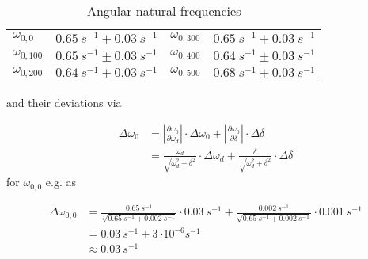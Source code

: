             \begin{table}[h]
                \centering
                \caption[Angular natural frequencies]{Angular natural frequencies}
                \begin{tabular}{@{}llll@{}}
                    \toprule
                    $\omega_{0,0}$      &$\SI{0.65}{s^{-1}} \pm \SI{0.03}{s^{-1}}$  &\hspace{10mm}$\omega_{0,300}$   &$\SI{0.65}{s^{-1}} \pm \SI{0.03}{s^{-1}}$\\
                    $\omega_{0,100}$    &$\SI{0.65}{s^{-1}} \pm \SI{0.03}{s^{-1}}$  &\hspace{10mm}$\omega_{0,400}$   &$\SI{0.64}{s^{-1}} \pm \SI{0.03}{s^{-1}}$\\
                    $\omega_{0,200}$    &$\SI{0.64}{s^{-1}} \pm \SI{0.03}{s^{-1}}$  &\hspace{10mm}$\omega_{0,500}$   &$\SI{0.68}{s^{-1}} \pm \SI{0.03}{s^{-1}}$\\
                    \bottomrule
                \end{tabular}
                \label{tab:angular_natural_frequencies}
            \end{table}
            and their deviations via\par
            \begin{align}
                \Delta\omega_0  &=\left| \frac{\partial\omega_0}{\partial\omega_d} \right| \cdot \Delta\omega_0 + \left| \frac{\partial\omega_0}{\partial\delta} \right| \cdot \Delta\delta \nonumber\\
                                &=\frac{\omega_d}{\sqrt{\omega_d^2+\delta^2}} \cdot \Delta\omega_d + \frac{\delta}{\sqrt{\omega_d^2+\delta^2}} \cdot \Delta\delta
            \end{align}
            for \(\omega_{0,0}\) e.g. as\par
            \begin{align*}
                \Delta\omega_{0,0}  &=\frac{\SI{0.65}{s^{-1}}}{\sqrt{\SI{0.65}{s^{-1}}+\SI{0.002}{s^{-1}}}} \cdot \SI{0.03}{s^{-1}} + \frac{\SI{0.002}{s^{-1}}}{\sqrt{\SI{0.65}{s^{-1}}+\SI{0.002}{s^{-1}}}} \cdot \SI{0.001}{s^{-1}}\\
                                    &=\SI{0.03}{s^{-1}}+\SI{3}{\cdot10^{-6}s^{-1}}\\
                                    &\approx\SI{0.03}{s^{-1}}
            \end{align*}
